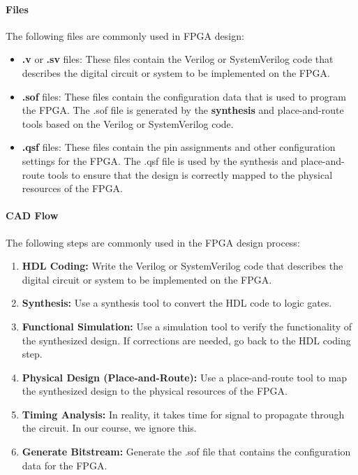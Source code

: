 \documentclass[11pt]{report}
\begin{document}
\paragraph{Files} The following files are commonly used in FPGA design:
\begin{itemize}
    \item \textbf{.v} or \textbf{.sv} files: These files contain the Verilog or SystemVerilog code that describes the digital circuit or system to be implemented on the FPGA.
    \item \textbf{.sof} files: These files contain the configuration data that is used to program the FPGA. The .sof file is generated by the \textbf{synthesis} and place-and-route tools based on the Verilog or SystemVerilog code.
    \item \textbf{.qsf} files: These files contain the pin assignments and other configuration settings for the FPGA. The .qsf file is used by the synthesis and place-and-route tools to ensure that the design is correctly mapped to the physical resources of the FPGA.
\end{itemize}

\paragraph{CAD Flow} The following steps are commonly used in the FPGA design process:
\begin{enumerate}
    \item \textbf{HDL Coding:} Write the Verilog or SystemVerilog code that describes the digital circuit or system to be implemented on the FPGA.
    \item \textbf{Synthesis:} Use a synthesis tool to convert the HDL code to logic gates.
    \item \textbf{Functional Simulation:} Use a simulation tool to verify the functionality of the synthesized design. If corrections are needed, go back to the HDL coding step.
    \item \textbf{Physical Design (Place-and-Route):} Use a place-and-route tool to map the synthesized design to the physical resources of the FPGA.
    \item \textbf{Timing Analysis:} In reality, it takes time for signal to propagate through the circuit. In our course, we ignore this.
    \item \textbf{Generate Bitstream:} Generate the .sof file that contains the configuration data for the FPGA.
\end{enumerate}
\end{document}
